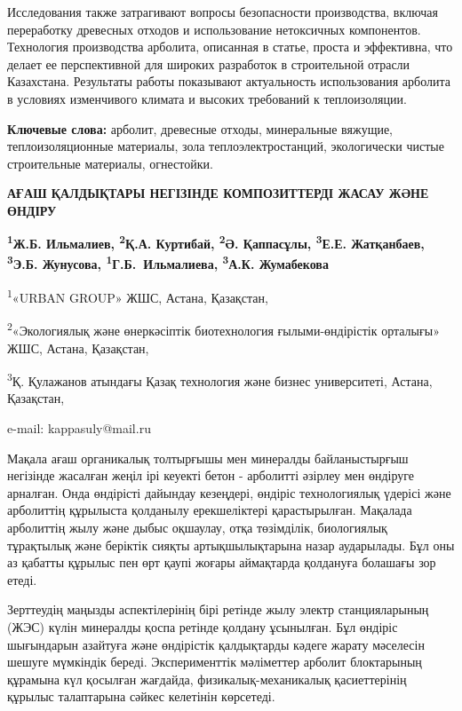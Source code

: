 Исследования также затрагивают вопросы безопасности производства,
включая переработку древесных отходов и использование нетоксичных
компонентов. Технология производства арболита, описанная в статье,
проста и эффективна, что делает ее перспективной для широких разработок
в строительной отрасли Казахстана. Результаты работы показывают
актуальность использования арболита в условиях изменчивого климата и
высоких требований к теплоизоляции.

{\bfseries Ключевые слова:} арболит, древесные отходы, минеральные вяжущие,
теплоизоляционные материалы, зола теплоэлектростанций, экологически
чистые строительные материалы, огнестойки.

\begin{articleheader}
{\bfseries АҒАШ ҚАЛДЫҚТАРЫ НЕГІЗІНДЕ КОМПОЗИТТЕРДІ ЖАСАУ ЖӘНЕ ӨНДІРУ}

{\bfseries
\textsuperscript{1}Ж.Б. Ильмалиев,
\textsuperscript{2}Қ.А. Куртибай,
\textsuperscript{2}Ә. Қаппасұлы\textsuperscript{\envelope },
\textsuperscript{3}Е.Е. Жатқанбаев,
\textsuperscript{3}Э.Б. Жунусова,
\textsuperscript{1}Г.Б.~Ильмалиева,
\textsuperscript{3}А.К. Жумабекова
}
\end{articleheader}

\begin{affiliation}
\textsuperscript{1}«URBAN GROUP» ЖШС, Астана, Қазақстан,

\textsuperscript{2}«Экологиялық және өнеркәсіптік биотехнология ғылыми-өндірістік орталығы» ЖШС, Астана, Қазақстан,

\textsuperscript{3}Қ. Қулажанов атындағы Қазақ технология және бизнес университеті, Астана, Қазақстан,

e-mail: kappasuly@mail.ru
\end{affiliation}

Мақала ағаш органикалық толтырғышы мен минералды байланыстырғыш
негізінде жасалған жеңіл ірі кеуекті бетон - арболитті әзірлеу мен
өндіруге арналған. Онда өндірісті дайындау кезеңдері, өндіріс
технологиялық үдерісі және арболиттің құрылыста қолданылу ерекшеліктері
қарастырылған. Мақалада арболиттің жылу және дыбыс оқшаулау, отқа
төзімділік, биологиялық тұрақтылық және беріктік сияқты артықшылықтарына
назар аударылады. Бұл оны аз қабатты құрылыс пен өрт қаупі жоғары
аймақтарда қолдануға болашағы зор етеді.

Зерттеудің маңызды аспектілерінің бірі ретінде жылу электр
станцияларының (ЖЭС) күлін минералды қоспа ретінде қолдану ұсынылған.
Бұл өндіріс шығындарын азайтуға және өндірістік қалдықтарды кәдеге
жарату мәселесін шешуге мүмкіндік береді. Эксперименттік мәліметтер
арболит блоктарының құрамына күл қосылған жағдайда,
физикалық-механикалық қасиеттерінің құрылыс талаптарына сәйкес келетінін
көрсетеді.

